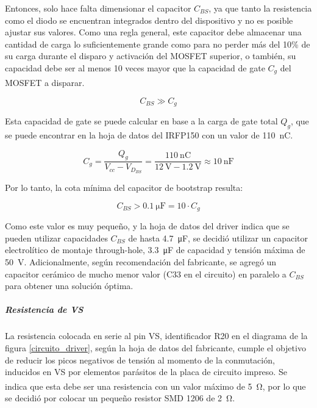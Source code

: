 Entonces, solo hace falta dimensionar el capacitor $C_{BS}$, ya que tanto la resistencia como el diodo se encuentran integrados dentro del dispositivo y no es posible ajustar sus valores. Como una regla general, este capacitor debe almacenar una cantidad de carga lo suficientemente grande como para no perder más del 10\% de su carga durante el disparo y activación del MOSFET superior, o también, su capacidad debe ser al menos 10 veces mayor que la capacidad de gate $C_g$ del MOSFET a disparar.\textsuperscript{\cite{Bootstrap}}

\begin{equation*}
    C_{BS} \gg C_g
\end{equation*}

Esta capacidad de gate se puede calcular en base a la carga de gate total $Q_g$, que se puede encontrar en la hoja de datos del IRFP150 con un valor de \SI[]{110}{\nano\coulomb}.

\begin{equation}\label{capacidad_gate}
    C_g = \frac{Q_g}{V_{cc}-V_{D_{BS}}} = \frac{\SI[]{110}{\nano\coulomb}}{\SI[]{12}{\volt}-\SI[]{1.2}{\volt}} \approx \SI[]{10}{\nano\farad}
\end{equation}

Por lo tanto, la cota mínima del capacitor de bootstrap resulta:

\begin{equation}\label{capacidad_bs_min}
    C_{BS} > \SI[]{0.1}{\micro\farad} = 10\cdot C_g
\end{equation}

Como este valor es muy pequeño, y la hoja de datos del driver indica que se pueden utilizar capacidades $C_{BS}$ de hasta \SI[]{4.7}{\micro\farad}, se decidió utilizar un capacitor electrolítico de montaje through-hole, \SI[]{3.3}{\micro\farad} de capacidad y tensión máxima de \SI[]{50}{\volt}. Adicionalmente, según recomendación del fabricante, se agregó un capacitor cerámico de mucho menor valor (C33 en el circuito) en paralelo a $C_{BS}$ para obtener una solución óptima.\\

\subparagraph{Resistencia de VS}

La resistencia colocada en serie al pin VS, identificador R20 en el diagrama de la figura \ref{circuito_driver}, según la hoja de datos del fabricante, cumple el objetivo de reducir los picos negativos de tensión al momento de la conmutación, inducidos en VS por elementos parásitos de la placa de circuito impreso. Se indica que esta debe ser una resistencia con un valor máximo de \SI[]{5}{\ohm}\textsuperscript{\cite{DatasheetDriver}}, por lo que se decidió por colocar un pequeño resistor SMD 1206 de \SI[]{2}{\ohm}.\\